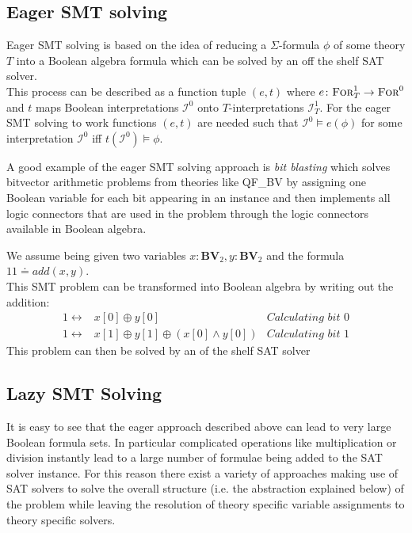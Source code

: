\subsection{Eager SMT solving}
Eager SMT solving is based on the idea of reducing a $\Sigma$-formula $\phi$ of some theory $T$ into a Boolean algebra formula which can be solved by an off the shelf SAT solver.\\
This process can be described as a function tuple $(e,t)$ where $e\colon\textsc{For}^1_T\to\textsc{For}^0$ and $t$ maps Boolean interpretations $\mathcal{I}^0$ onto $T$-interpretations $\mathcal{I}^1_T$. For the eager SMT solving to work functions $(e,t)$ are needed such that $\mathcal{I}^0\vDash e\left(\phi\right)$ for some interpretation $\mathcal{I}^0$ iff $t\left(\mathcal{I}^0\right)\vDash\phi$.
\par
A good example of the eager SMT solving approach is \textit{bit blasting} which solves bitvector arithmetic problems from theories like QF\_BV by assigning one Boolean variable for each bit appearing in an instance and then implements all logic connectors that are used in the problem through the logic connectors available in Boolean algebra.
\begin{example}[Addition]
We assume being given two variables $x\colon\mathbf{BV}_2, y\colon\mathbf{BV}_2$ and the formula $11\doteq add\left(x,y\right)$.\\
This SMT problem can be transformed into Boolean algebra by writing out the addition:
\begin{align*}
1 \leftrightarrow & x[0] \oplus y[0] & \textit{Calculating bit 0}\\
1 \leftrightarrow & x[1] \oplus y[1] \oplus \left(x[0] \land y[0] \right) & \textit{Calculating bit 1}
\end{align*}
This problem can then be solved by an of the shelf SAT solver
\end{example}

\subsection{Lazy SMT Solving}
It is easy to see that the eager approach described above can lead to very large Boolean formula sets. In particular complicated operations like multiplication or division instantly lead to a large number of formulae being added to the SAT solver instance. For this reason there exist a variety of approaches making use of SAT solvers to solve the overall structure (i.e. the abstraction explained below) of the problem while leaving the resolution of theory specific variable assignments to theory specific solvers.

